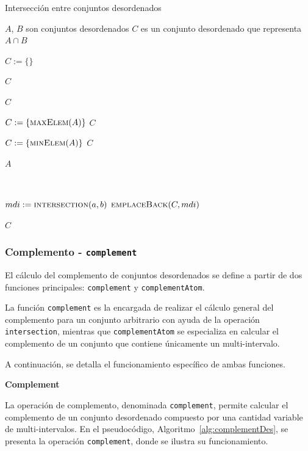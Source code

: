 \begin{algorithm}
\caption{Intersección entre conjuntos desordenados}\label{alg:interseccionDes}
\begin{algorithmic}[1]
\Require $A$, $B$ son conjuntos desordenados
\Ensure $C$ es un conjunto desordenado que representa $A \cap B$

\State $C := \{\}$

    \State \Return $C$
\EndIf

    \State \Return $C$
\EndIf

    \State $C := \{ \Call{maxElem}{A} \}$
    \State \Return $C$
\EndIf

    \State $C := \{\Call{minElem}{A} \}$
    \State \Return $C$
\EndIf

    \State \Return $A$
\EndIf

\

        \State $mdi := \Call{intersection}{a,b}$
            \State $\Call{emplaceBack}{C,mdi}$
        \EndIf
    \EndFor
\EndFor

\State \Return $C$
\EndFunction
\end{algorithmic}
\end{algorithm}

\subsubsection{Complemento - \texttt{complement}}

El cálculo del complemento de conjuntos desordenados se define a partir de dos funciones principales: \texttt{complement} y \texttt{complementAtom}. 

La función \texttt{complement} es la encargada de realizar el cálculo general del complemento para un conjunto arbitrario con ayuda de la operación \texttt{intersection}, mientras que \texttt{complementAtom} se especializa en calcular el complemento de un conjunto que contiene únicamente un multi-intervalo.

A continuación, se detalla el funcionamiento específico de ambas funciones.


\textbf{Complement}

La operación de complemento, denominada \texttt{complement}, permite calcular el complemento de un conjunto desordenado compuesto por una cantidad variable de multi-intervalos. En el pseudocódigo, Algoritmo~\ref{alg:complementDes}, se presenta la operación \texttt{complement}, donde se ilustra su funcionamiento.  

